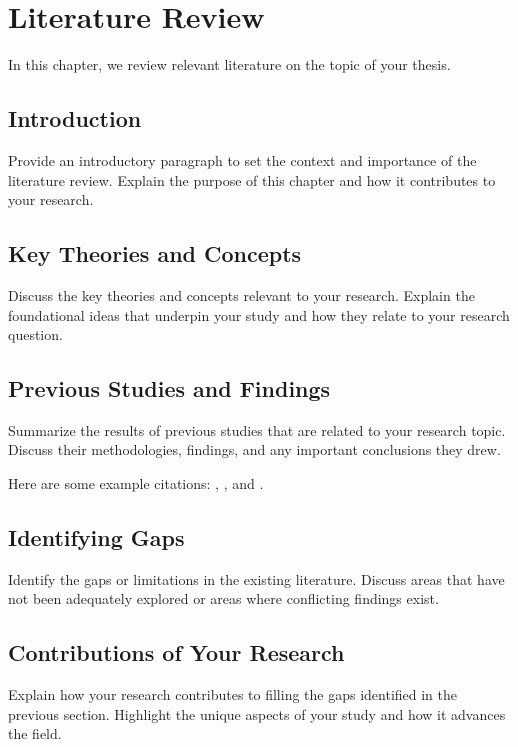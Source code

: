 
\chapter{Literature Review}

In this chapter, we review relevant literature on the topic of your thesis.

\section*{Introduction}

Provide an introductory paragraph to set the context and importance of the literature review. Explain the purpose of this chapter and how it contributes to your research.

\section*{Key Theories and Concepts}

Discuss the key theories and concepts relevant to your research. Explain the foundational ideas that underpin your study and how they relate to your research question.

\section*{Previous Studies and Findings}

Summarize the results of previous studies that are related to your research topic. Discuss their methodologies, findings, and any important conclusions they drew.

Here are some example citations: \cite{article_key}, \cite{book_key}, and \cite{conference_key}.

\section*{Identifying Gaps}

Identify the gaps or limitations in the existing literature. Discuss areas that have not been adequately explored or areas where conflicting findings exist.

\section*{Contributions of Your Research}

Explain how your research contributes to filling the gaps identified in the previous section. Highlight the unique aspects of your study and how it advances the field.

